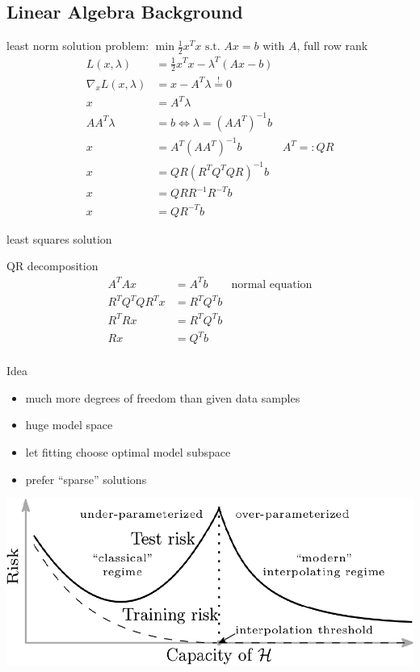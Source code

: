 \documentclass{beamer}
\begin{document}
\subsection{Linear Algebra Background}

\begin{frame} {least norm solution}
problem: \(\min \frac{1}{2} x^Tx \text{ s.t. } Ax = b\) with \(A\), full row rank
\pause
\begin{align*}
	L(x,\lambda) &= \frac{1}{2} x^Tx - \lambda^T (Ax -b)\\
	\nabla_x L(x,\lambda) &= x - A^T \lambda \stackrel{!}{=} 0\\
	x & = A^T \lambda\\
	AA^T \lambda &= b \Leftrightarrow \lambda = (AA^T)^{-1} b\\
	x &= A^T(AA^T)^{-1} b & A^T =: QR\\
	x &= QR(R^TQ^TQR)^{-1}b\\
	x &= QRR^{-1} R^{-T}b\\
	x &= QR^{-T}b
\end{align*}
\end{frame}

\begin{frame}{least squares solution}
\begin{block}{QR decomposition}
\begin{align*}
	A^TAx &= A^T b & \text{normal equation}\\
	R^TQ^TQR^Tx &= R^TQ^Tb\\
	R^TRx & = R^TQ^Tb\\
	Rx &= Q^T b\\
\end{align*}
\end{block}
\end{frame}

\begin{frame}{Idea}
\begin{itemize}
	\item much more degrees of freedom than given data samples
	\item huge model space
	\item let fitting choose optimal model subspace
	\item prefer \enquote{sparse} solutions
\end{itemize}
\vspace{0.1cm}
\pause
\includegraphics[width=\textwidth]{source/BenignOverfittingModel.png}
\end{frame}
\end{document}
